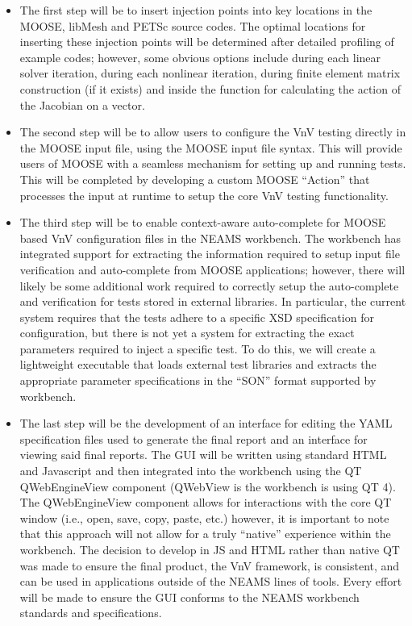 \begin{itemize}
 \item The first step will be to insert injection points into key locations in the MOOSE, libMesh and PETSc source codes. The optimal locations for 
 inserting these injection points will be determined after detailed profiling of example codes; however, some obvious options include during each linear 
 solver iteration, during each nonlinear iteration, during finite element matrix construction (if it exists) and inside the function for calculating the action of the Jacobian
 on a vector. 
 \item The second step will be to allow users to configure the VnV testing directly in the MOOSE input file, using the MOOSE input
file syntax. This will provide users of MOOSE with a seamless mechanism for setting up and running tests. This will be completed by
developing a custom MOOSE ``Action'' that processes the input at runtime to setup the core VnV testing functionality. 
\item The third step will be to enable context-aware auto-complete for MOOSE based VnV configuration files in the NEAMS workbench. The workbench
has integrated support for extracting the information required to setup input file verification and auto-complete from MOOSE applications; however, there
will likely be some additional work required to correctly setup the auto-complete and verification for tests stored in external libraries. In particular, the current system 
requires that the tests adhere to a specific XSD specification for configuration, but there is not yet a system for extracting the exact parameters required to inject a specific test. To do this, we will create a lightweight executable that loads external test libraries and extracts the appropriate parameter specifications in the ``SON'' format supported by workbench.  
\item The last step will be the development of an interface for editing the YAML specification files used to generate the final report and an interface 
for viewing said final reports. The GUI will be written using standard HTML and Javascript and then integrated into the workbench using the QT QWebEngineView component (QWebView is the workbench is using QT 4). The QWebEngineView component allows for interactions with the core QT window (i.e., open, save, copy, paste, etc.) however, it is important to note that this approach will not allow for a truly ``native'' experience within the workbench. The decision to develop in JS and HTML rather than native QT was made to ensure the final product, the VnV framework, is consistent, and can be used in applications outside of the NEAMS lines of tools. Every effort will be made to ensure the GUI conforms to the NEAMS workbench standards and specifications. 
\end{itemize}



